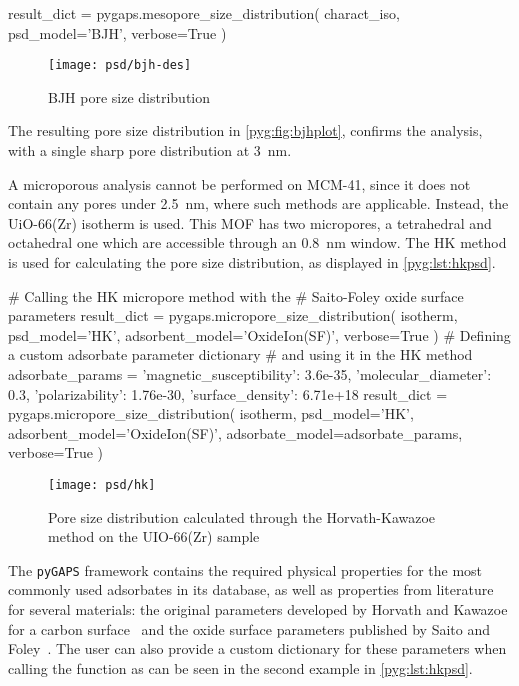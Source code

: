 \begin{python}[caption={PSD using the BJH method},%
    label={pyg:lst:bjh}]
result_dict = pygaps.mesopore_size_distribution(
    charact_iso,
    psd_model='BJH',
    verbose=True
)
\end{python}

\begin{figure}[!htb]
	\centering
	\texttt{[image: psd/bjh-des]}
	\caption{BJH pore size distribution}%
	\label{pyg:fig:bjhplot}
\end{figure}

The resulting pore size distribution in \autoref{pyg:fig:bjhplot},
confirms the analysis, with a single sharp pore distribution 
at \SI{3}{\nano\metre}.

A microporous analysis cannot be performed on MCM-41, since 
it does not contain any pores under \SI{2.5}{\nano\metre}, 
where such methods are applicable. Instead, the UiO-66(Zr)
isotherm is used. This MOF has two micropores, a tetrahedral
and octahedral one which are accessible through an \SI{0.8}{\nano\metre}
window. The HK method is used for calculating the pore size 
distribution, as displayed in \autoref{pyg:lst:hkpsd}.

\begin{python}[float=htb, caption={Using the HK method for PSD},%
    label={pyg:lst:hkpsd}]
# Calling the HK micropore method with the 
# Saito-Foley oxide surface parameters
result_dict = pygaps.micropore_size_distribution(
    isotherm,
    psd_model='HK',
    adsorbent_model='OxideIon(SF)',
    verbose=True
)
# Defining a custom adsorbate parameter dictionary 
# and using it in the HK method
adsorbate_params = {
    'magnetic_susceptibility': 3.6e-35,
    'molecular_diameter': 0.3,
    'polarizability': 1.76e-30,
    'surface_density': 6.71e+18
}
result_dict = pygaps.micropore_size_distribution(
    isotherm,
    psd_model='HK',
    adsorbent_model='OxideIon(SF)',
    adsorbate_model=adsorbate_params,
    verbose=True
)
\end{python}

\begin{figure}[!htb]
	\texttt{[image: psd/hk]}
	\caption{Pore size distribution calculated through the Horvath-Kawazoe method on the UIO-66(Zr) sample}%
	\label{fig:pyg:fig:hk}
\end{figure}

The \texttt{pyGAPS} framework contains the required physical properties
for the most commonly used adsorbates in its database, as well as
properties from literature for several materials:
the original parameters developed by Horvath and Kawazoe for a 
carbon surface~\cite{horvathMethodCalculationEffective1983} and the
oxide surface parameters published by Saito and
Foley~\cite{saitoCurvatureParametricSensitivity1991}.
The user can also provide a custom dictionary for these parameters
when calling the function as can be seen in the second example
in \autoref{pyg:lst:hkpsd}.

